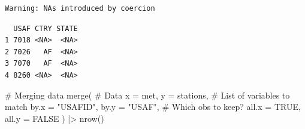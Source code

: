 \documentclass[
  letterpaper,
  DIV=11,
  numbers=noendperiod]{scrartcl}
\newenvironment{Shaded}{\begin{snugshade}}{\end{snugshade}}
\newcommand{\AttributeTok}[1]{\textcolor[rgb]{0.40,0.45,0.13}{#1}}
\newcommand{\CommentTok}[1]{\textcolor[rgb]{0.37,0.37,0.37}{#1}}
\newcommand{\ConstantTok}[1]{\textcolor[rgb]{0.56,0.35,0.01}{#1}}
\newcommand{\DecValTok}[1]{\textcolor[rgb]{0.68,0.00,0.00}{#1}}
\newcommand{\FunctionTok}[1]{\textcolor[rgb]{0.28,0.35,0.67}{#1}}
\newcommand{\NormalTok}[1]{\textcolor[rgb]{0.00,0.23,0.31}{#1}}
\newcommand{\OtherTok}[1]{\textcolor[rgb]{0.00,0.23,0.31}{#1}}
\newcommand{\SpecialCharTok}[1]{\textcolor[rgb]{0.37,0.37,0.37}{#1}}
\newcommand{\StringTok}[1]{\textcolor[rgb]{0.13,0.47,0.30}{#1}}
\begin{document}
\begin{verbatim}
Warning: NAs introduced by coercion
\end{verbatim}

\begin{Shaded}
\end{Shaded}

\begin{Shaded}
\end{Shaded}

\begin{verbatim}
  USAF CTRY STATE
1 7018 <NA>  <NA>
2 7026   AF  <NA>
3 7070   AF  <NA>
4 8260 <NA>  <NA>
\end{verbatim}

\begin{Shaded}
\begin{Highlighting}[]
\CommentTok{\# Merging data}
\FunctionTok{merge}\NormalTok{(}
  \CommentTok{\# Data}
  \AttributeTok{x     =}\NormalTok{ met,      }
  \AttributeTok{y     =}\NormalTok{ stations, }
  \CommentTok{\# List of variables to match}
  \AttributeTok{by.x  =} \StringTok{"USAFID"}\NormalTok{,}
  \AttributeTok{by.y  =} \StringTok{"USAF"}\NormalTok{, }
  \CommentTok{\# Which obs to keep?}
  \AttributeTok{all.x =} \ConstantTok{TRUE}\NormalTok{,      }
  \AttributeTok{all.y =} \ConstantTok{FALSE}
\NormalTok{  ) }\SpecialCharTok{|\textgreater{}} \FunctionTok{nrow}\NormalTok{()}
\end{Highlighting}
\end{Shaded}
\end{document}
